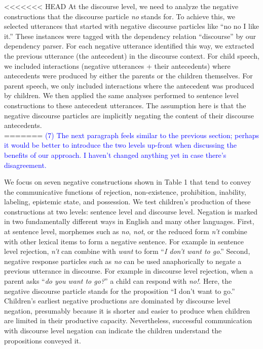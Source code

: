 \documentclass[
  english,
  man,floatsintext]{apa6}
\begin{document}
\textless\textless\textless\textless\textless\textless\textless{} HEAD
At the discourse level, we need to analyze the negative constructions that the discourse particle \emph{no} stands for. To achieve this, we selected utterances that started with negative discourse particles like ``no no I like it.'' These instances were tagged with the dependency relation ``discourse'' by our dependency parser. For each negative utterance identified this way, we extracted the previous utterance (the antecedent) in the discourse context. For child speech, we included interactions (negative utterances + their antecedents) where antecedents were produced by either the parents or the children themselves. For parent speech, we only included interactions where the antecedent was produced by children. We then applied the same analyses performed to sentence level constructions to these antecedent utterances. The assumption here is that the negative discourse particles are implicitly negating the content of their discourse antecedents.\\
=======
\textcolor{blue}{(7) The next paragraph feels similar to the previous section; perhaps it would be better to introduce the two levels up-front when discussing the benefits of our approach. I haven't changed anything yet in case there's disagreement.}

We focus on seven negative constructions shown in Table 1 that tend to convey the communicative functions of rejection, non-existence, prohibition, inability, labeling, epistemic state, and possession. We test children's production of these constructions at two levels: sentence level and discourse level. Negation is marked in two fundamentally different ways in English and many other languages. First, at sentence level, morphemes such as \emph{no}, \emph{not}, or the reduced form \emph{n't} combine with other lexical items to form a negative sentence. For example in sentence level rejection, \emph{n't} can combine with \emph{want} to form ``\emph{I don't want to go}.'' Second, negative response particles such as \emph{no} can be used anaphorically to negate a previous utterance in discourse. For example in discourse level rejection, when a parent asks ``\emph{do you want to go?}'' a child can respond with \emph{no!}. Here, the negative discourse particle stands for the proposition ``I don't want to go.'' Children's earliest negative productions are dominated by discourse level negation, presumably because it is shorter and easier to produce when children are limited in their productive capacity. Nevertheless, successful communication with discourse level negation can indicate the children understand the propositions conveyed it.
\end{document}
